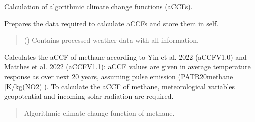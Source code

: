 \documentclass[a4paper,11pt,english]{sphinxmanual}
\begin{document}
\begin{fulllineitems}
\label{\detokenize{modules:climaccf.accf.GeTaCCFs}}
\pysigstartsignatures
{}
\pysigstopsignatures
\sphinxAtStartPar
Calculation of algorithmic climate change functions (aCCFs).

\begin{fulllineitems}
\label{\detokenize{modules:climaccf.accf.GeTaCCFs.__init__}}
\pysigstartsignatures
{}
\pysigstopsignatures
\sphinxAtStartPar
Prepares the data required to calculate aCCFs and store them in self.
\begin{quote}\begin{description}
\sphinxAtStartPar
{} () \textendash{} Contains processed weather data with all information.

\end{description}\end{quote}

\end{fulllineitems}


\begin{fulllineitems}
\label{\detokenize{modules:climaccf.accf.GeTaCCFs.accf_ch4}}
\pysigstartsignatures
{}
\pysigstopsignatures
\sphinxAtStartPar
Calculates the aCCF of methane according to Yin et al. 2022 (aCCF\sphinxhyphen{}V1.0) and Matthes et al. 2022 (aCCF\sphinxhyphen{}V1.1): aCCF values are  given in average 
temperature response as over next 20 years, assuming pulse emission (P\sphinxhyphen{}ATR20\sphinxhyphen{}methane {[}K/kg(NO2){]}). To calculate the aCCF of methane, meteorological
variables geopotential and incoming solar radiation are required.
\begin{quote}\begin{description}
\sphinxAtStartPar
Algorithmic climate change function of methane.


\end{description}
\end{quote}
\end{fulllineitems}
\end{fulllineitems}
\end{document}
